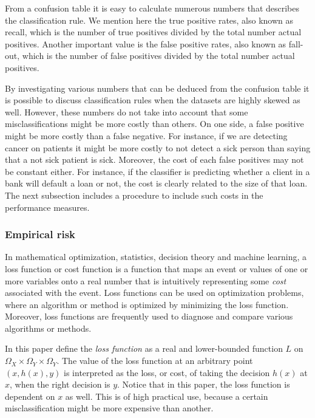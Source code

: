 From a confusion table it is easy to calculate numerous numbers that describes the classification rule.  We mention here
the true positive rates, also known as recall, which is the number of true positives divided by the total number actual positives.  Another important value is the false positive rates, also known as fall-out, which is the number of false positives divided by the total number actual positives. 


By investigating various numbers that can be deduced from the confusion table it is possible to discuss classification rules when the datasets are highly skewed as well.  However, these numbers do not take into account that some misclassifications might be more costly than others.  On one side, a false positive might be more costly than a false negative.  For instance, if we are detecting cancer on patients it might be more costly to not detect a sick person than saying that a not sick patient is sick.  Moreover, the cost of each false positives may not be constant either.  For instance, if the classifier is predicting whether a client in a bank will default a loan or not, the cost is clearly related to the size of that loan.  The next subsection includes a procedure to include such costs in the performance measures.

\subsubsection{Empirical risk}
\label{sec:empRisk}


In mathematical optimization, statistics, decision theory and machine learning, a loss function or cost function is a function that maps an event or values of one or more variables onto a real number that is intuitively representing some \emph{cost} associated with the event. Loss functions can be used on optimization problems, where an algorithm or method is optimized by minimizing the loss function.  Moreover, loss functions are frequently used to diagnose and compare various algorithms or methods.  

In this paper define the \emph{loss function} as a real and lower-bounded function $L$ on $\Omega_X \times \Omega_Y \times \Omega_Y$.  The value of the loss function at an arbitrary point $(x, h(x), y)$ is interpreted as the loss, or cost, of taking the decision $h(x)$ at $x$, when the right decision is $y$.  Notice that in this paper, the loss function is dependent on $x$ as well.  This is of high practical use, because a certain misclassification might be more expensive than another. 

